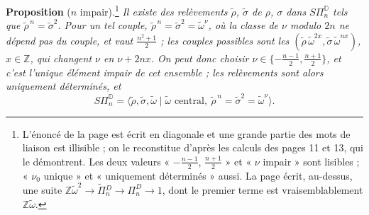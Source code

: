 \documentclass[11pt,a4paper]{article}
\begin{document}
\textbf{Proposition} ($n$ impair).\footnote{L'énoncé de la page est écrit en diagonale et une grande partie des mots
de liaison est illisible ; on le reconstitue d'après les calculs des pages 11 et
13, qui le démontrent. Les deux valeurs « $-\frac{n-1}{2}$, $\frac{n+1}{2}$ » et
« $\nu$ impair » sont lisibles ; « $\nu_0$ unique » et « uniquement déterminés »
aussi. La page écrit, au-dessus, une suite
$\mathbb{Z}\tilde\omega^2 \to \widetilde{\Pi}{}^{D}_n \to \Pi^{D}_n \to 1$, dont
le premier terme est vraisemblablement $\mathbb{Z}\tilde\omega$.} \emph{Il existe des relèvements $\tilde\rho$,
$\tilde\sigma$ de $\rho$, $\sigma$ dans $S\Pi^{\mathbb{D}}_n$ tels que
$\tilde\rho^{\,n} = \tilde\sigma^2$. Pour un tel couple,
$\tilde\rho^{\,n} = \tilde\sigma^2 = \tilde\omega^{\nu}$, où la classe de $\nu$
modulo $2n$ ne dépend pas du couple, et vaut $\frac{n^2+1}{2}$ ; les couples
possibles sont les $(\tilde\rho\,\tilde\omega^{2x}, \tilde\sigma\,\tilde\omega^{nx})$,
$x \in \mathbb{Z}$, qui changent $\nu$ en $\nu + 2nx$. On peut donc choisir
$\nu \in \{-\frac{n-1}{2}, \frac{n+1}{2}\}$, et c'est l'unique élément impair de
cet ensemble ; les relèvements sont alors uniquement déterminés, et}
\[
S\Pi^{\mathbb{D}}_n = \langle \tilde\rho, \tilde\sigma, \tilde\omega \mid
\tilde\omega \text{ central},\ \tilde\rho^{\,n} = \tilde\sigma^2 = \tilde\omega^{\nu}
\rangle .
\]
\end{document}
